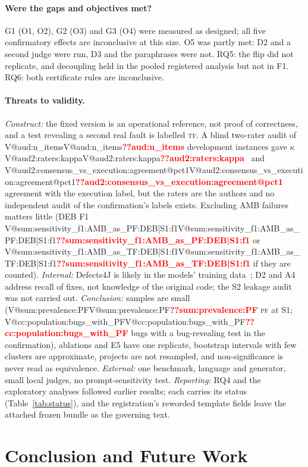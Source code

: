\documentclass[journal]{IEEEtran}
\makeatletter
\newcommand{\V}[1]{\ifcsname V@#1\endcsname\csname V@#1\endcsname\else\textbf{\textcolor{red}{??#1}}\fi}
\newcommand{\PF}{\textsc{pf}}
\newcommand{\TF}{\textsc{tf}}
\makeatother
\begin{document}
\paragraph{Were the gaps and objectives met?} G1 (O1, O2), G2 (O3) and G3 (O4) were measured as designed; all five confirmatory effects are inconclusive at this size. O5 was partly met: D2 and a second judge were run, D3 and the paraphrases were not. RQ5: the flip did not replicate, and decoupling held in the pooled registered analysis but not in F1. RQ6: both certificate rules are inconclusive.

\paragraph{Threats to validity.} \textit{Construct:} the fixed version is an operational reference, not proof of correctness, and a test revealing a second real fault is labelled \TF. A blind two-rater audit of \V{aud:n_items} development instances gave $\kappa$ \V{aud2:raters:kappa}~\cite{cohen1960kappa} and \V{aud2:consensus_vs_execution:agreement@pct1} agreement with the execution label, but the raters are the authors and no independent audit of the confirmation's labels exists. Excluding AMB failures matters little (DEB F1 \V{sum:sensitivity_f1:AMB_as_PF:DEB|S1:f1} or \V{sum:sensitivity_f1:AMB_as_TF:DEB|S1:f1} if they are counted). \textit{Internal:} Defects4J is likely in the models' training data~\cite{huang2026ult}; D2 and A4 address recall of fixes, not knowledge of the original code; the S2 leakage audit was not carried out. \textit{Conclusion:} samples are small (\V{sum:prevalence:PF} \PF{} at S1; \V{cc:population:bugs_with_PF} bugs with a bug-revealing test in the confirmation), ablations and E5 have one replicate, bootstrap intervals with few clusters are approximate, projects are not resampled, and non-significance is never read as equivalence. \textit{External:} one benchmark, language and generator, small local judges, no prompt-sensitivity test. \textit{Reporting:} RQ4 and the exploratory analyses followed earlier results; each carries its status (Table~\ref{tab:status}), and the registration's reworded template fields leave the attached frozen bundle as the governing text.

\section{Conclusion and Future Work}\label{sec:conclusion}
\end{document}
